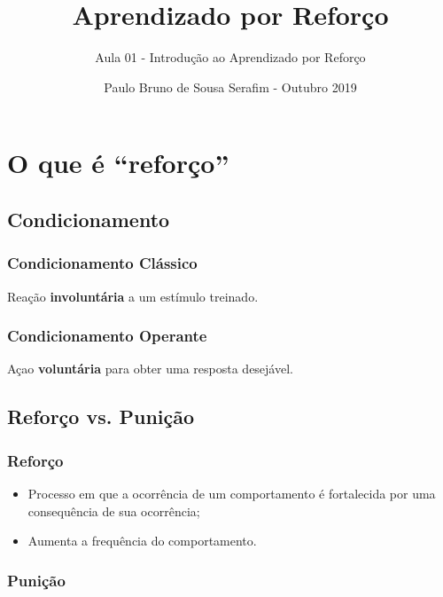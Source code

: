 \documentclass{article}
\title{Aprendizado por Reforço}
\author{Aula 01 - Introdução ao Aprendizado por Reforço}
\date{Paulo Bruno de Sousa Serafim - Outubro 2019}
\begin{document}
\maketitle

\section{O que é ``reforço''}

    \subsection{Condicionamento}
    
        \subsubsection{Condicionamento Clássico}
        
            Reação \textbf{involuntária} a um estímulo treinado.
        
        \subsubsection{Condicionamento Operante}
        
            Açao \textbf{voluntária} para obter uma resposta desejável.
        
    \subsection{Reforço vs. Punição}
    
        \subsubsection{Reforço}
        
            \begin{itemize}
                \item Processo em que a ocorrência de um comportamento é fortalecida por uma consequência de sua ocorrência;
                \item Aumenta a frequência do comportamento.
            \end{itemize}
        
        \subsubsection{Punição}
        
\end{document}
